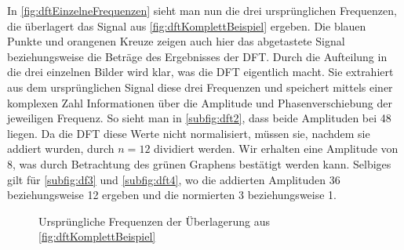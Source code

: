 In \autoref{fig:dftEinzelneFrequenzen} sieht man nun die drei ursprünglichen Frequenzen, die überlagert das Signal aus \autoref{fig:dftKomplettBeispiel} ergeben. Die blauen Punkte und orangenen Kreuze zeigen auch hier das abgetastete Signal beziehungsweise die Beträge des Ergebnisses der \acs{DFT}. Durch die Aufteilung in die drei einzelnen Bilder wird klar, was die \acs{DFT} eigentlich macht. Sie extrahiert aus dem ursprünglichen Signal diese drei Frequenzen und speichert mittels einer komplexen Zahl Informationen über die Amplitude und Phasenverschiebung der jeweiligen Frequenz. So sieht man in \autoref{subfig:dft2}, dass beide Amplituden bei 48 liegen. Da die \acs{DFT} diese Werte nicht normalisiert, müssen sie, nachdem sie addiert wurden, durch $n=12$ dividiert werden. Wir erhalten eine Amplitude von 8, was durch Betrachtung des grünen Graphens bestätigt werden kann. Selbiges gilt für \autoref{subfig:df3} und \autoref{subfig:dft4}, wo die addierten Amplituden 36 beziehungsweise 12 ergeben und die normierten 3 beziehungsweise 1.
\begin{figure}[bth]
  \hfill
  \hfill
  \centering{}
  \caption{Ursprüngliche Frequenzen der Überlagerung aus \autoref{fig:dftKomplettBeispiel}}
  \label{fig:dftEinzelneFrequenzen}
\end{figure}

